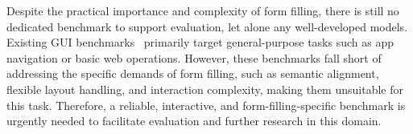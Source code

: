\documentclass[sigconf, screen, review]{acmart}
\begin{document}



Despite the practical importance and complexity of form filling, there is still no dedicated benchmark to support evaluation, let alone any well-developed models.
Existing GUI benchmarks~\cite{jzai24emnlp, craa23nips} primarily target general-purpose tasks such as app navigation or basic web operations.
However, these benchmarks fall short of addressing the specific demands of form filling, such as semantic alignment, flexible layout handling, and interaction complexity, making them unsuitable for this task.
Therefore, a reliable, interactive, and form-filling-specific benchmark is urgently needed to facilitate evaluation and further research in this domain.

\end{document}
